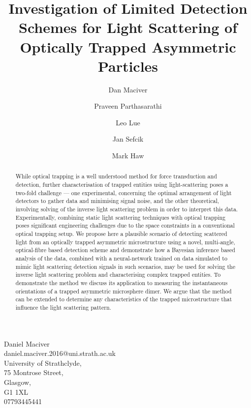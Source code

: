 \documentclass[final,  3p]{elsarticle}
\begin{document}
\begin{frontmatter}

\title{Investigation of Limited Detection Schemes for Light Scattering of Optically Trapped Asymmetric Particles}


\author[aff1]{Dan Maciver} 

\author[aff1]{Praveen Parthasarathi}

\author[aff1]{Leo Lue}

\author[aff1]{Jan Sefcik}

\author[aff1]{Mark Haw}

        
\begin{flushright}
	Daniel Maciver \\
	daniel.maciver.2016@uni.strath.ac.uk \\
	University of Strathclyde, \\
	75 Montrose Street, \\
	Glasgow, \\
	G1 1XL \\
	07793445441 
\end{flushright}

\begin{abstract}
  While optical trapping is a well understood method for force
  transduction and detection, further characterisation of trapped entities using light-scattering
  poses a two-fold challenge --- one experimental, concerning the optimal
  arrangement of light detectors to gather data and minimising signal noise, and the other theoretical, involving
  solving of the inverse light scattering problem in order to interpret this data. Experimentally, combining static
  light scattering techniques with optical trapping poses significant
  engineering challenges due to the space constraints in a
  conventional optical trapping setup.  We propose here a plausible
  scenario of detecting scattered light from an optically trapped
  asymmetric microstructure using a novel, multi-angle, optical-fibre
  based detection scheme and demonstrate how a Bayesian inference
  based analysis of the data, combined with a neural-network trained on data simulated to mimic light scattering
  detection signals in such scenarios, may be used for solving the
  inverse light scattering problem and characterising complex trapped
  entities.  To demonstrate the method we discuss its application to
  measuring the instantaneous orientations of a trapped asymmetric microsphere
  dimer. We argue that the method can be extended to
  determine any characteristics of the trapped microstructure that
  influence the light scattering pattern.
\end{abstract}
	

\end{frontmatter}
\end{document}
